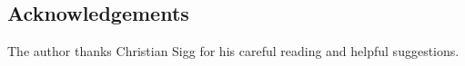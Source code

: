 \begin{appendix}
\section*{Acknowledgements}
The author thanks Christian Sigg for his careful reading and helpful
suggestions.
\end{appendix}